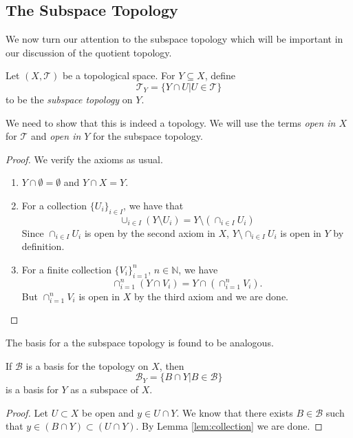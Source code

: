 \subsection{The Subspace Topology}
\label{sec:prelims:subspace}

We now turn our attention to the subspace topology which will be
important in our discussion of the quotient topology.

\begin{defn}
  Let $(X, \mathscr{T})$ be a topological space. For $Y \subseteq X$,
  define
  \[
    \mathscr{T}_Y = \{ Y \cap U | U \in \mathscr{T} \}
  \]
  to be the \emph{subspace topology} on $Y$.
\end{defn}

We need to show that this is indeed a topology. We will use the terms
\emph{open in $X$} for $\mathscr{T}$ and \emph{open in $Y$} for the
subspace topology.

\begin{proof}
  We verify the axioms as usual.
  \begin{enumerate}
  \item $Y \cap \emptyset = \emptyset$ and $Y \cap X = Y$.
  \item For a collection $\{U_i\}_{i \in I}$, we have that
    \[
      \cup_{i \in I}(Y \setminus U_i) = Y \setminus (\cap_{i \in I} U_i)
    \]
    Since $\cap_{i \in I} U_i$ is open by the second axiom in $X$, $Y
    \setminus \cap_{i \in I} U_i$ is open in $Y$ by definition.
  \item For a finite collection $\{V_i\}_{i=1}^n$, $n \in \mathbb{N}$,
    we have
    \[
      \cap_{i=1}^n (Y \cap V_i) = Y \cap (\cap_{i=1}^n V_i).
    \]
    But $\cap_{i=1}^n V_i$ is open in $X$ by the third axiom and we
    are done.
  \end{enumerate}
\end{proof}

The basis for a the subspace topology is found to be analogous.

\begin{lem}
  \label{lem:subspace}
  If $\mathscr{B}$ is a basis for the topology on $X$, then
  \[
    \mathscr{B}_Y = \{B \cap Y | B \in \mathscr{B}\}
  \]
  is a basis for $Y$ as a subspace of $X$.
\end{lem}

\begin{proof}
  Let $U \subset X$ be open and $y \in U \cap Y$. We know that there
  exists $B \in \mathscr{B}$ such that $y \in (B \cap Y) \subset (U
  \cap Y)$. By Lemma \ref{lem:collection} we are done.
\end{proof}

